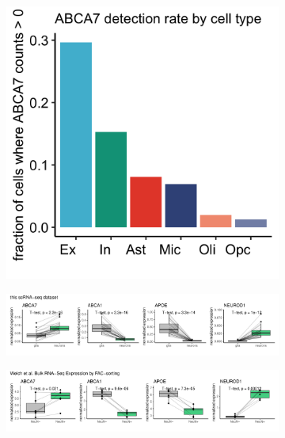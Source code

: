 \begin{figure}[ht]
    \begin{subfigure}[t]{.3\textwidth}
        \caption{}
        \includegraphics[width=\textwidth]{./extended_plots/abca7_detection_rate.png}        
    \end{subfigure}
    \par
    \begin{subfigure}[t]{1\textwidth}
        \caption{}
        \includegraphics[width=\textwidth]{./extended_plots/scRNAseq_bulk_rna.pdf}        
    \end{subfigure}
    \begin{subfigure}[t]{1\textwidth}
        \caption{}
        \includegraphics[width=\textwidth]{./extended_plots/welch_et_al_bulk_rna.pdf}        

\end{subfigure}
\end{figure}
